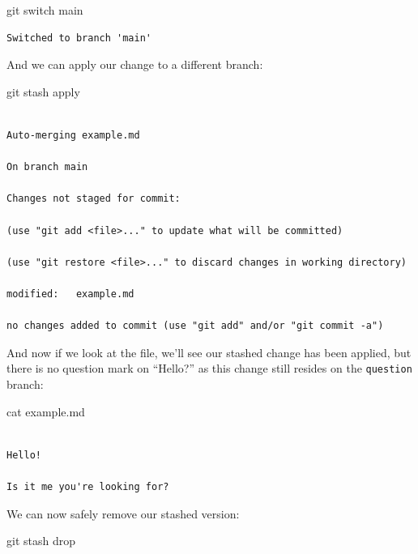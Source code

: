 \documentclass[
  letterpaper,
  DIV=11,
  numbers=noendperiod]{scrartcl}
\newenvironment{Shaded}{\begin{snugshade}}{\end{snugshade}}
\newcommand{\ControlFlowTok}[1]{\textcolor[rgb]{0.00,0.23,0.31}{#1}}
\newcommand{\NormalTok}[1]{\textcolor[rgb]{0.00,0.23,0.31}{#1}}
\begin{document}
\begin{Shaded}
\begin{Highlighting}[]
\NormalTok{git }\ControlFlowTok{switch}\NormalTok{ main}
\end{Highlighting}
\end{Shaded}

\begin{verbatim}
Switched to branch 'main'
\end{verbatim}

And we can apply our change to a different branch:

\begin{Shaded}
\begin{Highlighting}[]
\NormalTok{git stash apply}
\end{Highlighting}
\end{Shaded}

\begin{verbatim}

Auto-merging example.md

On branch main

Changes not staged for commit:

(use "git add <file>..." to update what will be committed)

(use "git restore <file>..." to discard changes in working directory)

modified:   example.md

no changes added to commit (use "git add" and/or "git commit -a")
\end{verbatim}

And now if we look at the file, we'll see our stashed change has been
applied, but there is no question mark on ``Hello?'' as this change
still resides on the \texttt{question} branch:

\begin{Shaded}
\begin{Highlighting}[]
\NormalTok{cat example.md}
\end{Highlighting}
\end{Shaded}

\begin{verbatim}

Hello!

Is it me you're looking for?
\end{verbatim}

We can now safely remove our stashed version:

\begin{Shaded}
\begin{Highlighting}[]
\NormalTok{git stash drop}
\end{Highlighting}
\end{Shaded}
\end{document}
